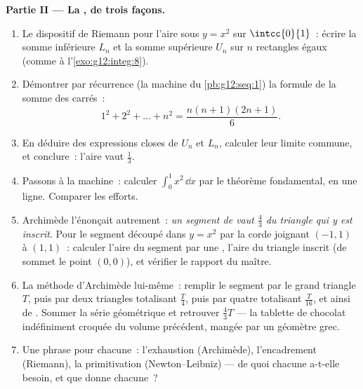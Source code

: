 \begin{problem}
\medskip
\noindent\textbf{Partie II --- La , de trois façons.}
\begin{enumerate}[resume]
  \item Le dispositif de Riemann pour l'aire sous $y = x^2$ sur
        $\intcc{0}{1}$~: écrire la somme inférieure $L_n$ et la
        somme supérieure $U_n$ sur $n$ rectangles égaux (comme à
        l'\cref{exo:g12:integ:8}).
  \item Démontrer par récurrence (la machine du
        \cref{pb:g12:seq:1}) la formule de la somme des carrés~:
        \[
        1^2 + 2^2 + \dots + n^2 = \frac{n(n+1)(2n+1)}{6} .
        \]
  \item En déduire des expressions closes de $U_n$ et $L_n$,
        calculer leur limite commune, et conclure~: l'aire vaut
        $\frac13$.
  \item Passons à la machine~: calculer $\int_0^1 x^2\,\dd x$ par
        le théorème fondamental, en une ligne. Comparer les
        efforts.
  \item Archimède l'énonçait autrement~: \emph{un segment de
         vaut $\frac43$ du triangle qui y est inscrit}. Pour
        le segment découpé dans $y = x^2$ par la corde joignant
        $(-1, 1)$ à $(1, 1)$~: calculer l'aire du segment par une
        , l'aire du triangle inscrit (de sommet le point
        $(0, 0)$), et vérifier le rapport du maître.
  \item La méthode d'Archimède lui-même~: remplir le segment par le
        grand triangle $T$, puis par deux triangles totalisant
        $\frac T4$, puis par quatre totalisant $\frac{T}{16}$, et
        ainsi de . Sommer la série géométrique et retrouver
        $\frac43 T$ --- la tablette de chocolat indéfiniment croquée
        du volume précédent, mangée par un géomètre grec.
  \item Une phrase pour chacune~: l'exhaustion (Archimède),
        l'encadrement (Riemann), la primitivation
        (Newton--Leibniz) --- de quoi chacune a-t-elle besoin, et
        que donne chacune~?
\end{enumerate}


\end{problem}
